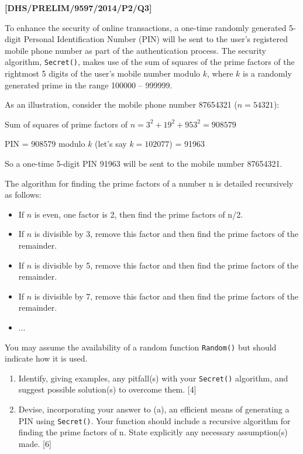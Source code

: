 \item \textbf{{[}DHS/PRELIM/9597/2014/P2/Q3{]} }

To enhance the security of online transactions, a one-time randomly
generated 5-digit Personal Identification Number (PIN) will be sent
to the user's registered mobile phone number as part of the authentication
process. The security algorithm, \texttt{Secret()}, makes use of the
sum of squares of the prime factors of the rightmost 5 digits of the
user's mobile number modulo $k$, where $k$ is a randomly generated
prime in the range 100000 -- 999999. 

As an illustration, consider the mobile phone number 87654321 ($n=54321$):

Sum of squares of prime factors of $n=3^{2}+19^{2}+953^{2}=908579$

PIN = 908579 modulo $k$ (let's say $k=102077$) = 91963 

So a one-time 5-digit PIN 91963 will be sent to the mobile number
87654321. 

The algorithm for finding the prime factors of a number n is detailed
recursively as follows: 
\begin{itemize}
\item If $n$ is even, one factor is 2, then find the prime factors of n/2. 
\item If $n$ is divisible by 3, remove this factor and then find the prime
factors of the remainder. 
\item If $n$ is divisible by 5, remove this factor and then find the prime
factors of the remainder. 
\item If $n$ is divisible by 7, remove this factor and then find the prime
factors of the remainder. 
\item ...
\end{itemize}
You may assume the availability of a random function \texttt{Random()}
but should indicate how it is used. 
\begin{enumerate}
\item Identify, giving examples, any pitfall(s) with your \texttt{Secret()}
algorithm, and suggest possible solution(s) to overcome them. \hfill{}{[}4{]}
\item Devise, incorporating your answer to (a), an efficient means of generating
a PIN using \texttt{Secret()}. Your function should include a recursive
algorithm for finding the prime factors of n. State explicitly any
necessary assumption(s) made. \hfill{}{[}6{]}
\end{enumerate}